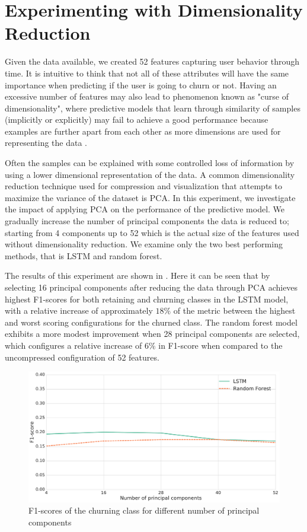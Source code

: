 \documentclass{kththesis}
\begin{document}
\section{Experimenting with Dimensionality Reduction}

Given the data available, we created 52 features capturing user behavior through time. It is intuitive to think that not all of these attributes will have the same importance when predicting if the user is going to churn or not. Having an excessive number of features may also lead to phenomenon known as "curse of dimensionality", where predictive models that learn through similarity of samples (implicitly or explicitly) may fail to achieve a good performance because examples are further apart from each other as more dimensions are used for representing the data \citep{domingos2012few}. 

Often the samples can be explained with some controlled loss of information by using a lower dimensional representation of the data. A common dimensionality reduction technique used for compression and visualization that attempts to maximize the variance of the dataset is PCA. In this experiment, we investigate the impact of applying PCA on the performance of the predictive model. We gradually increase the number of principal components the data is reduced to; starting from 4 components up to 52 which is the actual size of the features used without dimensionality reduction. We examine only the two best performing methods, that is LSTM and random forest.

The results of this experiment are shown in . Here it can be seen that by selecting 16 principal components after reducing the data through PCA achieves highest F1-scores for both retaining and churning classes in the LSTM model, with a relative increase of approximately $18\%$ of the metric between the highest and worst scoring configurations for the churned class. The random forest model exhibits a more modest improvement when 28 principal components are selected, which configures a relative increase of $6\%$ in F1-score when compared to the uncompressed configuration of 52 features.

\begin{figure}[H]
    \centering
    \includegraphics[width=1.0\textwidth,keepaspectratio]{figures/line_dim_reduction.pdf}
    \caption{F1-scores of the churning class for different number of principal components}
    \label{fig:line_dim_reduction}
\end{figure}
\end{document}
